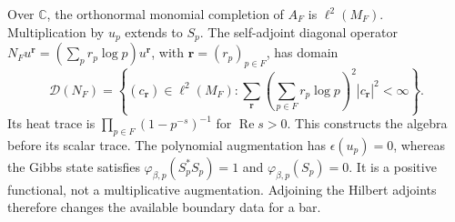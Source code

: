 Over $\mathbb C$, the orthonormal monomial completion of $A_F$ is
$\ell^2(M_F)$.  Multiplication by $u_p$ extends to $S_p$.
The self-adjoint diagonal operator
$N_Fu^{\mathbf r}=(\sum_pr_p\log p)u^{\mathbf r}$, with
$\mathbf r=(r_p)_{p\in F}$, has domain
\[
 \mathcal D(N_F)=\left\{(c_{\mathbf r})\in\ell^2(M_F):
 \sum_{\mathbf r}\left(\sum_{p\in F}r_p\log p\right)^2
                 |c_{\mathbf r}|^2<\infty\right\}.
\]
Its heat trace is
$\prod_{p\in F}(1-p^{-s})^{-1}$ for $\operatorname{Re}s>0$.
This constructs the algebra before its scalar trace.  The polynomial
augmentation has $\epsilon(u_p)=0$, whereas the Gibbs state satisfies
$\varphi_{\beta,p}(S_p^*S_p)=1$ and
$\varphi_{\beta,p}(S_p)=0$.  It is a positive functional, not a
multiplicative augmentation.  Adjoining the Hilbert adjoints therefore
changes the available boundary data for a bar.
